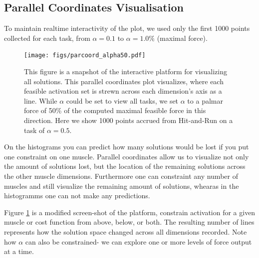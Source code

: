 \subsection{Parallel Coordinates Visualisation}
To maintain realtime interactivity of the plot, we used only the first 1000 points collected for each task, from $\alpha = 0.1$ to $\alpha = 1.0\%$ (maximal force).

\begin{figure}[htbp]
\centering
\texttt{[image: figs/parcoord\_alpha50.pdf]}
\caption{This figure is a snapshot of the interactive platform for visualizing all solutions. This parallel coordinates plot visualizes, where each feasible activation set is strewn across each dimension's axis as a line. While $\alpha$ could be set to view all tasks, we set $\alpha$ to a palmar force of 50\% of the computed maximal feasible force in this direction. Here we show 1000 points accrued from Hit-and-Run on a task of $\alpha=0.5$.}
\label{fig:parcoord_full}
\end{figure}

On the histograms you can predict how many solutions would be lost if you put one constraint on one muscle. Parallel coordinates allow us to visualize not only the amount of solutions lost, but the location of the remaining solutions across the other muscle dimensions. Furthermore one can constraint any number of muscles and still visualize the remaining amount of solutions, whearas in the histogramms one can not make any predictions.

Figure \ref{fig:parcoord_full} is a modified screen-shot of the platform, constrain activation for a given muscle or cost function from above, below, or both. The resulting number of lines represents how the solution space changed across all dimensions recorded.
Note how $\alpha$ can also be constrained- we can explore one or more levels of force output at a time.

